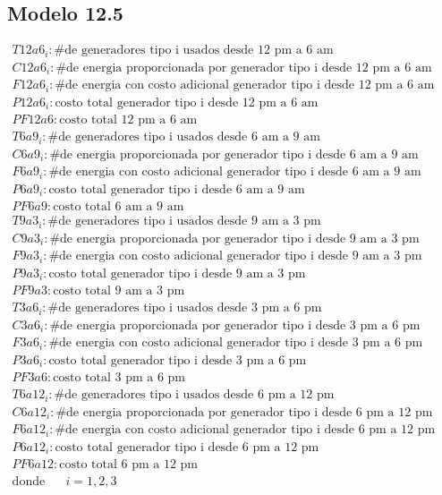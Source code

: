 \subsection{Modelo 12.5}
$\begin{array}{l}
T12a6_{i}:\mbox{\# de generadores tipo i usados desde 12 pm a 6 am}\\
C12a6_{i}:\mbox{\# de energia proporcionada por generador tipo i desde 12 pm a 6 am}\\
F12a6_{i}:\mbox{\# de energia con costo adicional generador tipo i desde 12 pm a 6 am}\\
P12a6_{i}:\mbox{costo total generador tipo i desde 12 pm a 6 am}\\
PF12a6:\mbox{costo total 12 pm a 6 am}\\
T6a9_{i}:\mbox{\# de generadores tipo i usados desde 6 am a 9 am}\\
C6a9_{i}:\mbox{\# de energia proporcionada por generador tipo i desde 6 am a 9 am}\\
F6a9_{i}:\mbox{\# de energia con costo adicional generador tipo i desde 6 am a 9 am}\\
P6a9_{i}:\mbox{costo total generador tipo i desde 6 am a 9 am}\\
PF6a9:\mbox{costo total 6 am a 9 am}\\
T9a3_{i}:\mbox{\# de generadores tipo i usados desde 9 am a 3 pm}\\
C9a3_{i}:\mbox{\# de energia proporcionada por generador tipo i desde 9 am a 3 pm}\\
F9a3_{i}:\mbox{\# de energia con costo adicional generador tipo i desde 9 am a 3 pm}\\
P9a3_{i}:\mbox{costo total generador tipo i desde 9 am a 3 pm}\\
PF9a3:\mbox{costo total 9 am a 3 pm}\\
T3a6_{i}:\mbox{\# de generadores tipo i usados desde 3 pm a 6 pm}\\
C3a6_{i}:\mbox{\# de energia proporcionada por generador tipo i desde 3 pm a 6 pm}\\
F3a6_{i}:\mbox{\# de energia con costo adicional generador tipo i desde 3 pm a 6 pm}\\
P3a6_{i}:\mbox{costo total generador tipo i desde 3 pm a 6 pm}\\
PF3a6:\mbox{costo total 3 pm a 6 pm}\\
T6a12_{i}:\mbox{\# de generadores tipo i usados desde 6 pm a 12 pm}\\
C6a12_{i}:\mbox{\# de energia proporcionada por generador tipo i desde 6 pm a 12 pm}\\
F6a12_{i}:\mbox{\# de energia con costo adicional generador tipo i desde 6 pm a 12 pm}\\
P6a12_{i}:\mbox{costo total generador tipo i desde 6 pm a 12 pm}\\
PF6a12:\mbox{costo total 6 pm a 12 pm}\\
\mbox{donde} \;\;\;\;\;\; i=1,2,3   
\end{array}$
